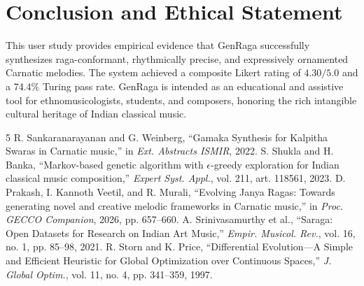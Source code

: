 \documentclass[conference,letterpaper]{IEEEtran}
\begin{document}
\section{Conclusion and Ethical Statement}
This user study provides empirical evidence that GenRaga successfully synthesizes raga-conformant, rhythmically precise, and expressively ornamented Carnatic melodies. The system achieved a composite Likert rating of $4.30/5.0$ and a 74.4\% Turing pass rate. GenRaga is intended as an educational and assistive tool for ethnomusicologists, students, and composers, honoring the rich intangible cultural heritage of Indian classical music.

\begin{thebibliography}{5}
 R. Sankaranarayanan and G. Weinberg, ``Gamaka Synthesis for Kalpitha Swaras in Carnatic music,'' in \emph{Ext. Abstracts ISMIR}, 2022.
 S. Shukla and H. Banka, ``Markov-based genetic algorithm with $\epsilon$-greedy exploration for Indian classical music composition,'' \emph{Expert Syst. Appl.}, vol. 211, art. 118561, 2023.
 D. Prakash, I. Kannoth Veetil, and R. Murali, ``Evolving Janya Ragas: Towards generating novel and creative melodic frameworks in Carnatic music,'' in \emph{Proc. GECCO Companion}, 2026, pp. 657--660.
 A. Srinivasamurthy et al., ``Saraga: Open Datasets for Research on Indian Art Music,'' \emph{Empir. Musicol. Rev.}, vol. 16, no. 1, pp. 85--98, 2021.
 R. Storn and K. Price, ``Differential Evolution---A Simple and Efficient Heuristic for Global Optimization over Continuous Spaces,'' \emph{J. Global Optim.}, vol. 11, no. 4, pp. 341--359, 1997.
\end{thebibliography}
\end{document}
